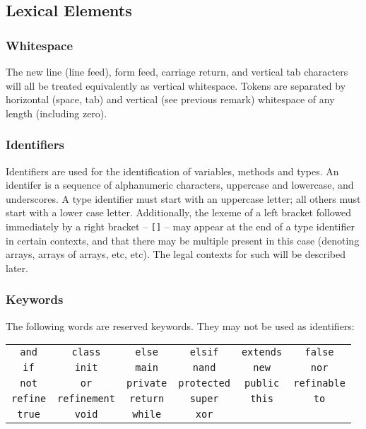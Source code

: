 \subsection{Lexical Elements}
\subsubsection{Whitespace}
The new line (line feed), form feed, carriage return, and vertical tab characters will all be treated equivalently as vertical whitespace. Tokens are separated by horizontal (space, tab) and vertical (see previous remark) whitespace of any length (including zero).

\subsubsection{Identifiers}
Identifiers are used for the identification of variables,  methods and types. An identifer is a sequence of alphanumeric characters, uppercase and lowercase, and underscores. A type identifier must start with an uppercase letter; all others must start with a lower case letter. Additionally, the lexeme of a left bracket followed immediately by a right bracket -- \verb![]! -- may appear at the end of a type identifier in certain contexts, and that there may be multiple present in this case (denoting arrays, arrays of arrays, etc, etc). The legal contexts for such will be described later.

\subsubsection{Keywords}
The following words are reserved keywords. They may not be used as identifiers:
\begin{center}
\begin{tabular}{cccccc}
\verb!and! & \verb!class! & \verb!else! & \verb!elsif! & \verb!extends! & \verb!false!\\
\verb!if! & \verb!init! & \verb!main! & \verb!nand! & \verb!new! & \verb!nor!\\
\verb!not! & \verb!or! & \verb!private! & \verb!protected! & \verb!public! & \verb!refinable!\\
\verb!refine! & \verb!refinement! & \verb!return! & \verb!super! & \verb!this! & \verb!to! \\
\verb!true! & \verb!void! & \verb!while! & \verb!xor!\\
\end{tabular}
\end{center}

